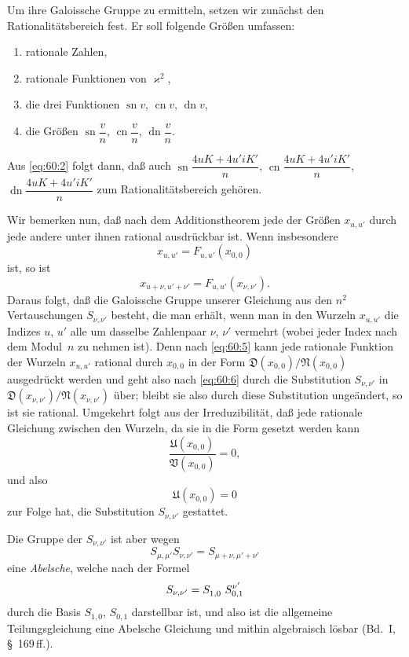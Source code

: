 \documentclass[11pt,a4paper]{article}
\theoremstyle{plain}
\theoremstyle{remark}
\newcommand{\D}{\mathfrak{D}}
\newcommand{\UU}{\mathfrak{U}}
\newcommand{\VV}{\mathfrak{V}}
\newcommand{\Num}{\mathfrak{N}}
\begin{document}
Um ihre Galoissche Gruppe zu ermitteln, setzen wir zunächst
den Rationalitätsbereich fest. Er soll folgende Größen umfassen:
\begin{enumerate}[label=\arabic*.]
\item rationale Zahlen,
\item rationale Funktionen von $\varkappa^2$,
\item die drei Funktionen $\operatorname{sn}v$, $\operatorname{cn}v$,
      $\operatorname{dn}v$,
\item die Größen $\operatorname{sn}\dfrac{v}{n}$,
      $\operatorname{cn}\dfrac{v}{n}$,
      $\operatorname{dn}\dfrac{v}{n}$.
\end{enumerate}
Aus \eqref{eq:60:2} folgt dann, daß auch
$\operatorname{sn}\dfrac{4uK+4u'iK'}{n}$,
$\operatorname{cn}\dfrac{4uK+4u'iK'}{n}$,
$\operatorname{dn}\dfrac{4uK+4u'iK'}{n}$
zum Rationalitätsbereich gehören.

Wir bemerken nun, daß nach dem Additionstheorem jede der
Größen $x_{u,u'}$ durch jede andere unter ihnen rational
ausdrückbar ist. Wenn insbesondere
\begin{equation}\label{eq:60:5}
x_{u,u'} = F_{u,u'}(x_{0,0})
\end{equation}
ist, so ist
\begin{equation}\label{eq:60:6}
x_{u+\nu,u'+\nu'} = F_{u,u'}(x_{\nu,\nu'}).
\end{equation}
Daraus folgt, daß die Galoissche Gruppe unserer Gleichung aus
den $n^2$ Vertauschungen $S_{\nu,\nu'}$ besteht, die man erhält,
wenn man in den Wurzeln $x_{u,u'}$ die Indizes $u$, $u'$ alle
um dasselbe Zahlenpaar $\nu$, $\nu'$ vermehrt (wobei jeder Index
nach dem Modul~$n$ zu nehmen ist). Denn nach
\eqref{eq:60:5} kann jede rationale Funktion der Wurzeln
$x_{u,u'}$ rational durch $x_{0,0}$ in der Form
$\D(x_{0,0})/\Num(x_{0,0})$ ausgedrückt werden und geht also
nach \eqref{eq:60:6} durch die Substitution $S_{\nu,\nu'}$ in
$\D(x_{\nu,\nu'})/\Num(x_{\nu,\nu'})$ über; bleibt sie also durch
diese Substitution ungeändert, so ist sie rational. Umgekehrt
folgt aus der Irreduzibilität, daß jede rationale Gleichung
zwischen den Wurzeln, da sie in die Form gesetzt werden kann
\[
\frac{\UU(x_{0,0})}{\VV(x_{0,0})}=0,
\]
und also
\[
\UU(x_{0,0}) = 0
\]
zur Folge hat, die Substitution $S_{\nu,\nu'}$ gestattet.

Die Gruppe der $S_{\nu,\nu'}$ ist aber wegen
\[
S_{\mu,\mu'} S_{\nu,\nu'}
= S_{\mu+\nu,\mu'+\nu'}
\]
eine \emph{Abelsche}, welche nach der Formel
\[
S_{\nu,\nu'} = S_{1,0}^{\vphantom{\nu}}\,\, S_{0,1}^{\nu'}
\]
durch die Basis $S_{1,0}$, $S_{0,1}$ darstellbar ist, und also
ist die allgemeine Teilungsgleichung eine Abelsche Gleichung
und mithin algebraisch lösbar (Bd.~I, \S~169\,ff.).
\end{document}
